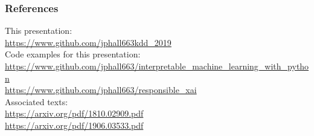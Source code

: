 \documentclass[11pt,
               aspectratio=169,
               hyperref={colorlinks}
               ]{beamer}
\begin{document}


	\begin{frame}[t, allowframebreaks]
	
		\frametitle{References}	
		
			This presentation:\\
			\tiny{\url{https://www.github.com/jphall663kdd_2019}}\\
			\vspace{10pt}
			\normalsize Code examples for this presentation:\\
			\tiny{\url{https://www.github.com/jphall663/interpretable_machine_learning_with_python}}\\
			\noindent\tiny{\url{https://www.github.com/jphall663/responsible_xai}}\\
			\vspace{10pt}
			\normalsize Associated texts:\\
			\tiny{\url{https://arxiv.org/pdf/1810.02909.pdf}}\\
			\noindent\tiny{\url{https://arxiv.org/pdf/1906.03533.pdf}}
								
		\framebreak		
		
		\tiny
		\printbibliography
		
	\end{frame}
\end{document}

